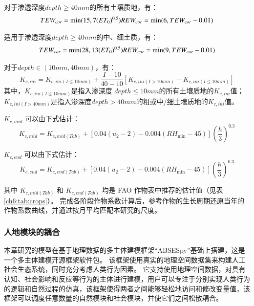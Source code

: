 对于渗透深度$depth \geq 40mm$的所有土壤质地，有：
\begin{equation}
    TEW_{cor} = \min(15, 7 {(ET_0)}^{0.5}) \\
    REW_{cor} = \min(6, TEW_{cor} - 0.01)
\end{equation}

适用于渗透深度$depth \geq 40mm$的中、细土质，有：
\begin{equation}
    TEW_{cor} = \min(28, 13{(ET_0)}^{0.5}) \\
    REW_{cor} = \min(9, TEW_{cor} - 0.01)
\end{equation}

对于$depth \in (10mm, 40mm)$，有：
\begin{equation}
    K_{c, ini} = K_{c, ini(I \leq 10mm)} + \frac{I-10}{40-10}[K_{c, ini(I>10mm)} - K_{c, ini(I \leq 10mm)}]
\end{equation}
其中，$K_{c, ini(I \leq 10mm)}$是指入渗深度 $depth \leq 10 mm$的所有土壤质地的$K_{c, ini}$值；$K_{c, ini(I > 40 mm)}$是指入渗深度$depth>40 mm$的粗或中/细土壤质地的$K_{c, ini}$值。

$K_{c, mid}$ 可以由下式估计：
\begin{equation}
    K_{c, mid} = K_{c, mid(Tab)} + [0.04(u_2 - 2) -0.004(RH_{\min} - 45)]{(\frac{h}{3})}^{0.3}
\end{equation}

$K_{c, end}$ 可以由下式估计：
\begin{equation}
    K_{c, end} = K_{c, end(Tab)} + [0.04(u_2 - 2) -0.004(RH_{\min} - 45)]{(\frac{h}{3})}^{0.3}
\end{equation}

其中 $K_{c, mid(Tab)}$ 和 $K_{c, end(Tab)}$ 均是 FAO 作物表中推荐的估计值（见表\ref{ch6:tab:crops}）。
完成各阶段作物系数计算后，参考作物的生长周期还原当年的作物系数曲线，并通过按月平均匹配本研究的尺度。

\subsubsection{人地模块的耦合}

本章研究的模型在基于地理数据的多主体建模框架“ABSESpy”基础上搭建，这是一个多主体建模开源框架软件包\cite{song2023}。
该框架使用真实的地理空间数据集来构建人工社会生态系统，同时充分考虑人类行为因素。
它支持使用地理空间数据，对具有认知、社会影响和反应等行为的主体进行建模，用户可以专注于分别实现人类行为的逻辑和自然过程的仿真，该框架使得两者之间能够轻松地访问和修改变量值，该框架可以调度任意数量的自然模块和社会模块，并使它们之间松散耦合。

